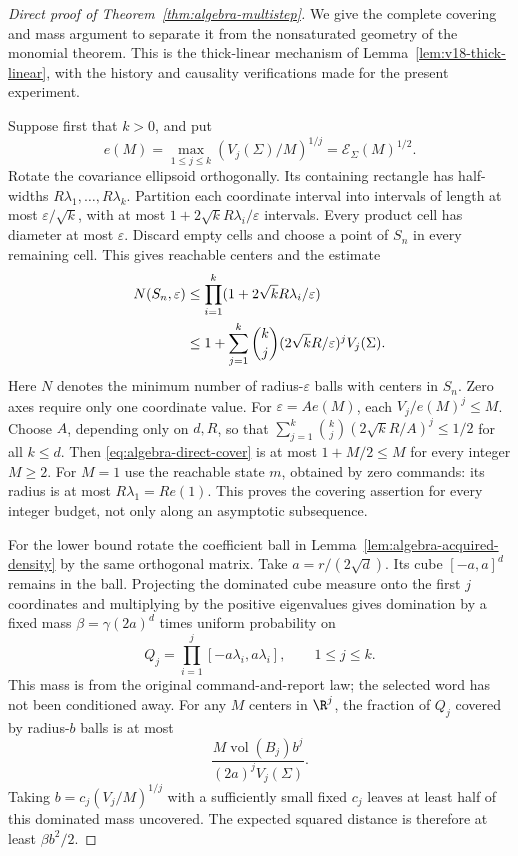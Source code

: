 \begin{proof}[Direct proof of Theorem~\ref{thm:algebra-multistep}]
We give the complete covering and mass argument to separate it from the
nonsaturated geometry of the monomial theorem. This is the thick-linear
mechanism of Lemma~\ref{lem:v18-thick-linear}, with the history and
causality verifications made for the present experiment.

Suppose first that $k>0$, and put
\[
 e(M)=\max_{1\le j\le k}(V_j(\Sigma)/M)^{1/j}
                         =\mathcal E_\Sigma(M)^{1/2}.
\]
Rotate the covariance ellipsoid orthogonally. Its containing rectangle
has half-widths $R\lambda_1,\ldots,R\lambda_k$. Partition each
coordinate interval into intervals of length at most
$\varepsilon/\sqrt{k}$, with at most
$1+2\sqrt{k}R\lambda_i/\varepsilon$ intervals. Every product cell
has diameter at most $\varepsilon$. Discard empty cells and choose a
point of $S_n$ in every remaining cell. This gives reachable centers
and the estimate
\begin{align}
 N(S_n,\varepsilon)
 &\le\prod_{i=1}^k
         (1+2\sqrt{k}R\lambda_i/\varepsilon)\notag\\
 &\le 1+\sum_{j=1}^k\binom{k}{j}
                (2\sqrt{k}R/\varepsilon)^jV_j(\Sigma).
       \label{eq:algebra-direct-cover}
\end{align}
Here $N$ denotes the minimum number of radius-$\varepsilon$ balls
with centers in $S_n$. Zero axes require only one coordinate value.
For $\varepsilon=Ae(M)$, each $V_j/e(M)^j\le M$.
Choose $A$, depending only on $d,R$, so that
$\sum_{j=1}^k\binom{k}{j}(2\sqrt{k}R/A)^j\le1/2$ for
all $k\le d$. Then \eqref{eq:algebra-direct-cover} is at most
$1+M/2\le M$ for every integer $M\ge2$. For $M=1$ use the
reachable state $m$, obtained by zero commands: its radius is at most
$R\lambda_1=Re(1)$. This proves the covering assertion for every
integer budget, not only along an asymptotic subsequence.

For the lower bound rotate the coefficient ball in
Lemma~\ref{lem:algebra-acquired-density} by the same orthogonal matrix.
Take $a=r/(2\sqrt d)$. Its cube $[-a,a]^d$ remains in the ball.
Projecting the dominated cube measure onto the first $j$ coordinates
and multiplying by the positive eigenvalues gives domination by a
fixed mass $\beta=\gamma(2a)^d$ times uniform probability on
\[
 Q_j=\prod_{i=1}^j[-a\lambda_i,a\lambda_i],
                       \qquad 1\le j\le k.
\]
This mass is from the original command-and-report law; the selected
word has not been conditioned away. For any $M$ centers in $\R^j$,
the fraction of $Q_j$ covered by radius-$b$ balls is at most
\[
 \frac{M\operatorname{vol}(B_j)b^j}{(2a)^jV_j(\Sigma)}.
\]
Taking $b=c_j(V_j/M)^{1/j}$ with a sufficiently small fixed $c_j$
leaves at least half of this dominated mass uncovered. The expected
squared distance is therefore at least $\beta b^2/2$.


\end{proof}
